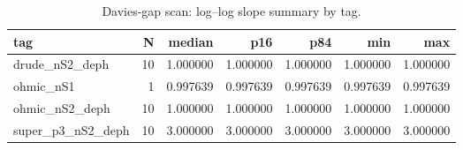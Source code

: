 \begin{table}[t]
\centering
\caption{Davies-gap scan: log--log slope summary by tag.}
\label{tab:gap_scan_slope_by_tag}
\begin{tabular}{lrrrrrr}
\hline
tag & N & median & p16 & p84 & min & max \\
\hline
drude\_nS2\_deph & 10 & 1.000000 & 1.000000 & 1.000000 & 1.000000 & 1.000000 \\
ohmic\_nS1 & 1 & 0.997639 & 0.997639 & 0.997639 & 0.997639 & 0.997639 \\
ohmic\_nS2\_deph & 10 & 1.000000 & 1.000000 & 1.000000 & 1.000000 & 1.000000 \\
super\_p3\_nS2\_deph & 10 & 3.000000 & 3.000000 & 3.000000 & 3.000000 & 3.000000 \\
\hline
\end{tabular}
\end{table}
